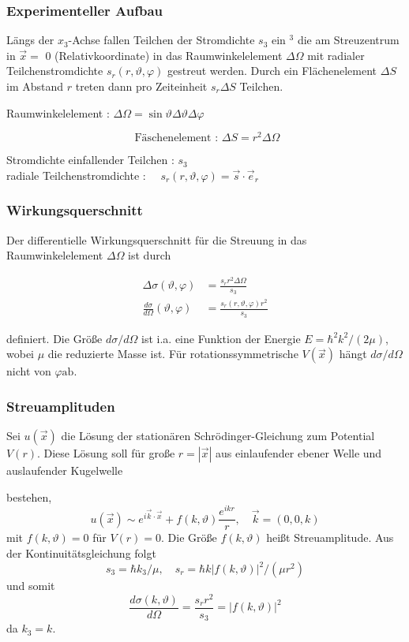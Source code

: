 \documentclass[10pt, letterpaper]{article}
\begin{document}
\subsubsection*{Experimenteller Aufbau}
Längs der $x_{3}$-Achse fallen Teilchen der Stromdichte $s_{3}$ ein ${ }^{3}$ die am Streuzentrum in $\vec{x}=$ 0 (Relativkoordinate) in das Raumwinkelelement $\Delta \Omega$ mit radialer Teilchenstromdichte $s_{r}(r, \vartheta, \varphi)$ gestreut werden. Durch ein Flächenelement $\Delta S$ im Abstand $r$ treten dann pro Zeiteinheit $s_{r} \Delta S$ Teilchen.

Raumwinkelelement : $\Delta \Omega=\sin \vartheta \Delta \vartheta \Delta \varphi$

$$
\text { Fäschenelement : } \Delta S=r^{2} \Delta \Omega
$$

Stromdichte einfallender Teilchen : $s_{3}$\\
radiale Teilchenstromdichte : $\quad s_{r}(r, \vartheta, \varphi)=\vec{s} \cdot \vec{e}_{r}$

\subsubsection*{Wirkungsquerschnitt}
Der differentielle Wirkungsquerschnitt für die Streuung in das Raumwinkelelement $\Delta \Omega$ ist durch

$$
\begin{aligned}
\Delta \sigma(\vartheta, \varphi) & =\frac{s_{r} r^{2} \Delta \Omega}{s_{3}} \\
\frac{d \sigma}{d \Omega}(\vartheta, \varphi) & =\frac{s_{r}(r, \vartheta, \varphi) r^{2}}{s_{3}}
\end{aligned}
$$

definiert. Die Größe $d \sigma / d \Omega$ ist i.a. eine Funktion der Energie $E=\hbar^{2} k^{2} /(2 \mu)$, wobei $\mu$ die reduzierte Masse ist. Für rotationssymmetrische $V(\vec{x})$ hängt $d \sigma / d \Omega$ nicht von $\varphi \mathrm{ab}$.

\subsubsection*{Streuamplituden}
Sei $u(\vec{x})$ die Lösung der stationären Schrödinger-Gleichung zum Potential $V(r)$. Diese Lösung soll für große $r=|\vec{x}|$ aus einlaufender ebener Welle und auslaufender Kugelwelle

bestehen,
$$
u(\vec{x}) \sim e^{i \vec{k} \cdot \vec{x}}+f(k, \vartheta) \frac{e^{i k r}}{r}, \quad \vec{k}=(0,0, k)
$$
mit $f(k, \vartheta)=0$ für $V(r)=0$. Die Größe $f(k, \vartheta)$ heißt Streuamplitude. Aus der Kontinuitätsgleichung folgt
$$
s_{3}=\hbar k_{3} / \mu, \quad s_{r}=\hbar k|f(k, \vartheta)|^{2} /\left(\mu r^{2}\right)
$$
und somit
$$
\frac{d \sigma(k, \vartheta)}{d \Omega}=\frac{s_{r} r^{2}}{s_{3}}=|f(k, \vartheta)|^{2}
$$
da $k_{3}=k$.
\end{document}
